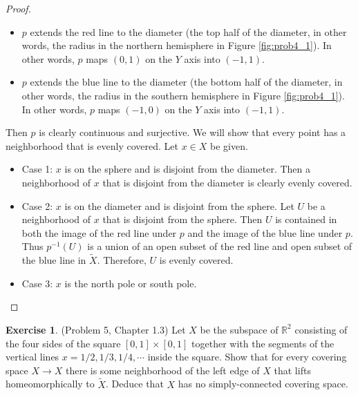 \documentclass[12pt, psamsfonts]{amsart}
\theoremstyle{definition}
\newtheorem*{exer}{Exercise}
\theoremstyle{remark}
\numberwithin{equation}{section}
\begin{document}
\begin{proof}
\begin{itemize}
\begin{itemize}
        \item
          $p$ extends the red line to the diameter (the top half of the diameter, in other words, the radius in the northern hemisphere in Figure \ref{fig:prob4_1}).
          In other words, $p$ maps $(0, 1)$ on the $Y$ axis into $(-1, 1)$.
        \item
          $p$ extends the blue line to the diameter (the bottom half of the diameter, in other words, the radius in the southern hemisphere in Figure \ref{fig:prob4_1}).
          In other words, $p$ maps $(-1, 0)$ on the $Y$ axis into $(-1, 1)$.
      \end{itemize}
      Then $p$ is clearly continuous and surjective.
      We will show that every point has a neighborhood that is evenly covered.
      Let $x \in X$ be given.
      \begin{itemize}
        \item
          Case 1: $x$ is on the sphere and is disjoint from the diameter.
          Then a neighborhood of $x$ that is disjoint from the diameter is clearly evenly covered.
        \item
          Case 2: $x$ is on the diameter and is disjoint from the sphere.
          Let $U$ be a neighborhood of $x$ that is disjoint from the sphere.
          Then $U$ is contained in both the image of the red line under $p$ and the image of the blue line under $p$.
          Thus $p^{-1}(U)$ is a union of an open subset of the red line and open subset of the blue line in $\tilde{X}$.
          Therefore, $U$ is evenly covered.
        \item
          Case 3: $x$ is the north pole or south pole.
      \end{itemize}
  \end{itemize}
\end{proof}

\begin{exer}{(Problem 5, Chapter 1.3)}
  Let $X$ be the subspace of $\mathbb{R}^2$ consisting of the four sides of the square $[0, 1] \times [0, 1]$ together with the segments of the vertical lines $x = 1/2, 1/3, 1/4, \cdots$ inside the square.
  Show that for every covering space $X \rightarrow X$ there is some neighborhood of the left edge of $X$ that lifts homeomorphically to $\tilde{X}$.
  Deduce that $X$ has no simply-connected covering space.
\end{exer}
\end{document}
